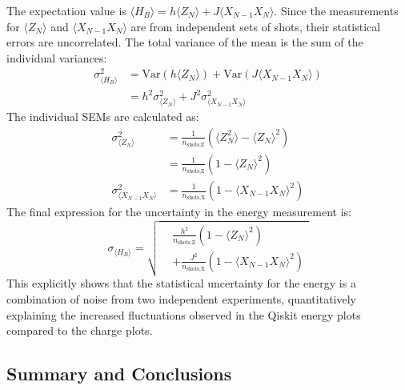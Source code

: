 The expectation value is $\langle H_B \rangle = h\langle Z_N \rangle + J\langle X_{N-1}X_N \rangle$. Since the measurements for $\langle Z_N \rangle$ and $\langle X_{N-1}X_N \rangle$ are from independent sets of shots, their statistical errors are uncorrelated. The total variance of the mean is the sum of the individual variances:
\begin{equation}
    \begin{aligned}
        \sigma_{\langle H_B \rangle}^2 &= \text{Var}(h\langle Z_N \rangle) + \text{Var}(J\langle X_{N-1}X_N \rangle) \\
        &= h^2 \sigma_{\langle Z_N \rangle}^2 + J^2 \sigma_{\langle X_{N-1}X_N \rangle}^2
    \end{aligned}
\end{equation}
The individual SEMs are calculated as:
\begin{align}
    \sigma_{\langle Z_N \rangle}^2 &= \frac{1}{n_{\text{shots,Z}}} \left( \langle Z_N^2 \rangle - \langle Z_N \rangle^2 \right) \nonumber\\
    &= \frac{1}{n_{\text{shots,Z}}} \left( 1 - \langle Z_N \rangle^2 \right) \\
    \sigma_{\langle X_{N-1}X_N \rangle}^2 &= \frac{1}{n_{\text{shots,X}}} \left( 1 - \langle X_{N-1}X_N \rangle^2 \right)
\end{align}
The final expression for the uncertainty in the energy measurement is:
\begin{equation}
    \sigma_{\langle H_B \rangle} = \sqrt{
        \begin{aligned}    
        &\frac{h^2}{n_{\text{shots,Z}}} (1 - \langle Z_N \rangle^2) \\
        &+ \frac{J^2}{n_{\text{shots,X}}} (1 - \langle X_{N-1}X_N \rangle^2)
        \end{aligned}
    }
\end{equation}
This explicitly shows that the statistical uncertainty for the energy is a combination of noise from two independent experiments, quantitatively explaining the increased fluctuations observed in the Qiskit energy plots compared to the charge plots.

\subsection{Summary and Conclusions}

